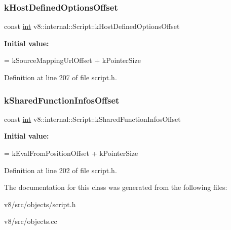 \subsubsection{\texorpdfstring{k\+Host\+Defined\+Options\+Offset}{kHostDefinedOptionsOffset}}
{\footnotesize\ttfamily const \mbox{\hyperlink{classint}{int}} v8\+::internal\+::\+Script\+::k\+Host\+Defined\+Options\+Offset\hspace{0.3cm}{\ttfamily [static]}}

{\bfseries Initial value\+:}
\begin{DoxyCode}
=
      kSourceMappingUrlOffset + kPointerSize
\end{DoxyCode}


Definition at line 207 of file script.\+h.

\mbox{\label{classv8_1_1internal_1_1Script_a94d43a301690a2d4daa0bc3c0f828600}} 
\subsubsection{\texorpdfstring{k\+Shared\+Function\+Infos\+Offset}{kSharedFunctionInfosOffset}}
{\footnotesize\ttfamily const \mbox{\hyperlink{classint}{int}} v8\+::internal\+::\+Script\+::k\+Shared\+Function\+Infos\+Offset\hspace{0.3cm}{\ttfamily [static]}}

{\bfseries Initial value\+:}
\begin{DoxyCode}
=
      kEvalFromPositionOffset + kPointerSize
\end{DoxyCode}


Definition at line 202 of file script.\+h.



The documentation for this class was generated from the following files\+:\begin{DoxyCompactItemize}
\item 
v8/src/objects/script.\+h\item 
v8/src/objects.\+cc\end{DoxyCompactItemize}
